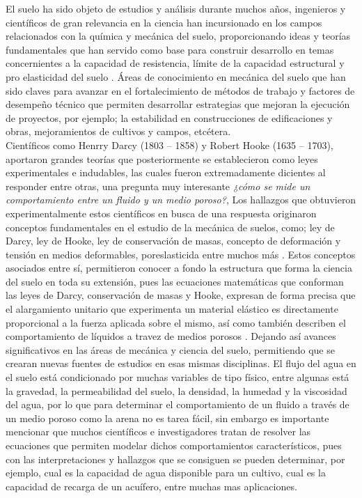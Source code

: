 El suelo ha sido objeto de estudios y análisis durante muchos años, ingenieros y científicos de gran relevancia en la ciencia han incursionado en los campos relacionados con la química y mecánica del suelo, proporcionando ideas y teorías fundamentales que han servido como base para construir desarrollo en temas concernientes a la capacidad de resistencia, límite de la capacidad estructural y pro elasticidad del suelo \parencite{field2011soil}. Áreas de conocimiento en mecánica del suelo que han sido claves para avanzar en el fortalecimiento de métodos de trabajo y factores de desempeño técnico que permiten desarrollar estrategias que mejoran la ejecución de proyectos, por ejemplo; la estabilidad en construcciones de edificaciones y obras, mejoramientos de cultivos y campos, etcétera.\\

Científicos como Henrry Darcy (1803 – 1858) y Robert Hooke  (1635 – 1703), aportaron grandes teorías que posteriormente se establecieron como leyes experimentales e indudables, las cuales fueron extremadamente dicientes al responder entre otras, una pregunta muy interesante \textit{¿cómo se mide un comportamiento entre un fluido y un medio poroso?}, Los hallazgos que obtuvieron experimentalmente estos científicos en busca de una respuesta originaron conceptos fundamentales en el estudio de la mecánica de suelos, como; ley de Darcy, ley de Hooke, ley de conservación de masas, concepto de deformación y tensión en medios deformables, poreslasticida entre muchos más \parencite{munozsimulacion}.  Estos conceptos asociados entre sí, permitieron conocer a fondo la estructura que forma la ciencia del suelo en toda su extensión, pues las ecuaciones matemáticas que conforman las leyes de Darcy, conservación de masas y Hooke, expresan de forma precisa que el alargamiento unitario que experimenta un material elástico es directamente proporcional a la fuerza aplicada sobre el mismo, así como también describen el comportamiento de líquidos a travez de medios porosos  \parencite{barrere1992closure}. Dejando así avances significativos en las áreas de mecánica y ciencia del suelo, permitiendo que se crearan nuevas fuentes de estudios en esas mismas disciplinas. El flujo del agua en el suelo está condicionado por muchas variables de tipo físico, entre algunas está la gravedad, la permeabilidad del suelo, la densidad, la humedad y la viscosidad del agua, por lo que para determinar el comportamiento de un fluido a través de un medio poroso como la arena no es tarea fácil, sin embargo es importante mencionar que muchos científicos e investigadores tratan de resolver las ecuaciones que permiten modelar dichos comportamientos característicos, pues con las interpretaciones y hallazgos que se consiguen se pueden determinar, por ejemplo, cual es la capacidad de agua disponible para un cultivo, cual es la capacidad de recarga de un acuífero, entre muchas mas aplicaciones.

